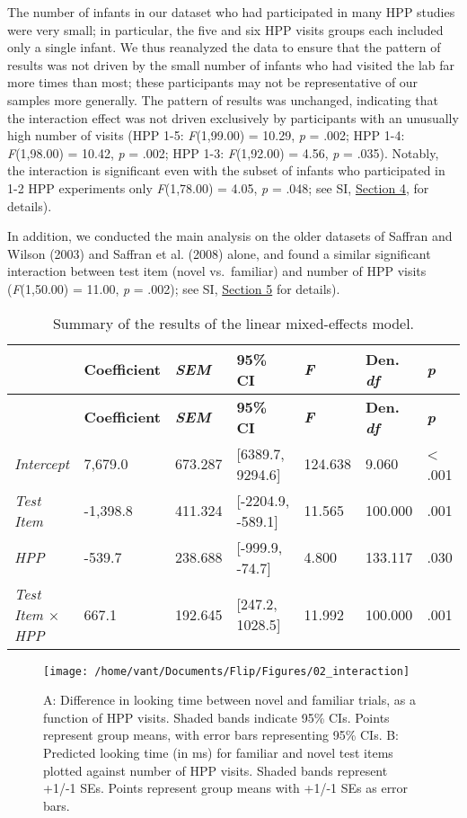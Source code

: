 \documentclass[
  english,
  man,man,floatsintext]{apa6}
\begin{document}
The number of infants in our dataset who had participated in many HPP studies were very small; in particular, the five and six HPP visits groups each included only a single infant. We thus reanalyzed the data to ensure that the pattern of results was not driven by the small number of infants who had visited the lab far more times than most; these participants may not be representative of our samples more generally. The pattern of results was unchanged, indicating that the interaction effect was not driven exclusively by participants with an unusually high number of visits (HPP 1-5: \emph{F}(1,99.00) = 10.29, \emph{p} = .002; HPP 1-4: \emph{F}(1,98.00) = 10.42, \emph{p} = .002; HPP 1-3: \emph{F}(1,92.00) = 4.56, \emph{p} = .035). Notably, the interaction is significant even with the subset of infants who participated in 1-2 HPP experiments only \emph{F}(1,78.00) = 4.05, \emph{p} = .048; see SI, \protect\hyperlink{s4}{Section 4}, for details).

In addition, we conducted the main analysis on the older datasets of Saffran and Wilson (2003) and Saffran et al. (2008) alone, and found a similar significant interaction between test item (novel vs.~familiar) and number of HPP visits (\emph{F}(1,50.00) = 11.00, \emph{p} = .002); see SI, \protect\hyperlink{s5}{Section 5} for details).

\begin{longtable}[]{@{}lllllll@{}}
\caption{\label{tab:tab1}Summary of the results of the linear mixed-effects model.}\tabularnewline
\toprule
& \textbf{Coefficient} & \textbf{\emph{SEM}} & \textbf{95\% CI} & \textbf{\emph{F}} & \textbf{Den. \emph{df}} & \textbf{\emph{p}}\tabularnewline
\midrule
\endfirsthead
\toprule
& \textbf{Coefficient} & \textbf{\emph{SEM}} & \textbf{95\% CI} & \textbf{\emph{F}} & \textbf{Den. \emph{df}} & \textbf{\emph{p}}\tabularnewline
\midrule
\endhead
\emph{Intercept} & 7,679.0 & 673.287 & {[}6389.7, 9294.6{]} & 124.638 & 9.060 & \textless{} .001\tabularnewline
\emph{Test Item} & -1,398.8 & 411.324 & {[}-2204.9, -589.1{]} & 11.565 & 100.000 & .001\tabularnewline
\emph{HPP} & -539.7 & 238.688 & {[}-999.9, -74.7{]} & 4.800 & 133.117 & .030\tabularnewline
\emph{Test Item \(\times\) HPP} & 667.1 & 192.645 & {[}247.2, 1028.5{]} & 11.992 & 100.000 & .001\tabularnewline
\bottomrule
\end{longtable}

\begin{figure}
\texttt{[image: /home/vant/Documents/Flip/Figures/02\_interaction]} \caption{A: Difference in looking time between novel and familiar trials, as a function of HPP visits. Shaded bands indicate 95\% CIs. Points represent group means, with error bars representing 95\% CIs. B: Predicted looking time (in ms) for familiar and novel test items plotted against number of HPP visits. Shaded bands represent +1/-1 SEs. Points represent group means with +1/-1 SEs as error bars.}\label{fig:fig2}
\end{figure}
\end{document}

